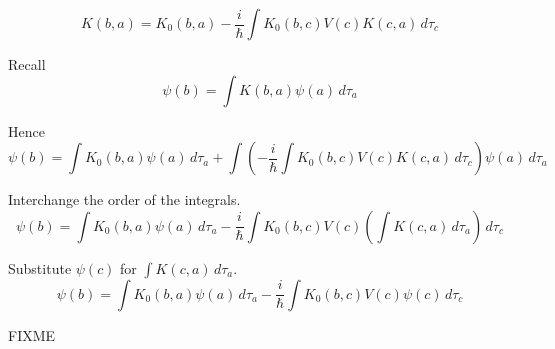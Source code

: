 


\bigskip
\begin{equation*}
K(b,a)=K_0(b,a)-\frac{i}{\hbar}\int K_0(b,c)V(c)K(c,a)\,d\tau_c
\end{equation*}

Recall
\begin{equation*}
\psi(b)=\int K(b,a)\psi(a)\,d\tau_a
\end{equation*}

Hence
\begin{equation*}
\psi(b)=\int K_0(b,a)\psi(a)\,d\tau_a
+\int\left(-\frac{i}{\hbar}\int K_0(b,c)V(c)K(c,a)\,d\tau_c\right)\psi(a)\,d\tau_a
\end{equation*}

Interchange the order of the integrals.
\begin{equation*}
\psi(b)=\int K_0(b,a)\psi(a)\,d\tau_a
-\frac{i}{\hbar}\int K_0(b,c)V(c)\left(\int K(c,a)\,d\tau_a\right)\,d\tau_c
\end{equation*}

Substitute $\psi(c)$ for $\int K(c,a)\,d\tau_a$.
\begin{equation*}
\psi(b)=\int K_0(b,a)\psi(a)\,d\tau_a
-\frac{i}{\hbar}\int K_0(b,c)V(c)\psi(c)\,d\tau_c
\end{equation*}

FIXME



